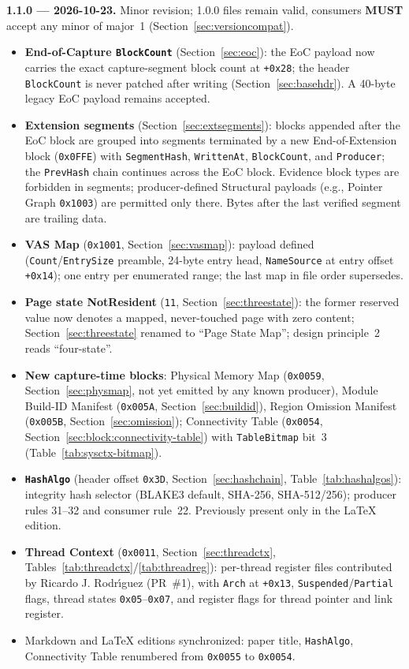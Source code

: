 \documentclass[11pt,a4paper]{article}
\newcommand{\MUST}{\textbf{MUST}}
\newcommand{\hex}[1]{\texttt{0x#1}}
\newcommand{\field}[1]{\texttt{#1}}
\begin{document}
\noindent\textbf{1.1.0 --- 2026-10-23.} Minor revision; 1.0.0 files remain valid, consumers \MUST{} accept any minor of major~1 (Section~\ref{sec:versioncompat}).
\begin{itemize}[leftmargin=1.5em, itemsep=3pt]
\item \textbf{End-of-Capture \field{BlockCount}} (Section~\ref{sec:eoc}): the EoC payload now carries the exact capture-segment block count at \texttt{+0x28}; the header \field{BlockCount} is never patched after writing (Section~\ref{sec:basehdr}). A 40-byte legacy EoC payload remains accepted.
\item \textbf{Extension segments} (Section~\ref{sec:extsegments}): blocks appended after the EoC block are grouped into segments terminated by a new End-of-Extension block (\hex{0FFE}) with \field{SegmentHash}, \field{WrittenAt}, \field{BlockCount}, and \field{Producer}; the \field{PrevHash} chain continues across the EoC block. Evidence block types are forbidden in segments; producer-defined Structural payloads (e.g., Pointer Graph \hex{1003}) are permitted only there. Bytes after the last verified segment are trailing data.
\item \textbf{VAS Map} (\hex{1001}, Section~\ref{sec:vasmap}): payload defined (\field{Count}/\field{EntrySize} preamble, 24-byte entry head, \field{NameSource} at entry offset \texttt{+0x14}); one entry per enumerated range; the last map in file order supersedes.
\item \textbf{Page state NotResident} (\texttt{11}, Section~\ref{sec:threestate}): the former reserved value now denotes a mapped, never-touched page with zero content; Section~\ref{sec:threestate} renamed to ``Page State Map''; design principle~2 reads ``four-state''.
\item \textbf{New capture-time blocks}: Physical Memory Map (\hex{0059}, Section~\ref{sec:physmap}, not yet emitted by any known producer), Module Build-ID Manifest (\hex{005A}, Section~\ref{sec:buildid}), Region Omission Manifest (\hex{005B}, Section~\ref{sec:omission}); Connectivity Table (\hex{0054}, Section~\ref{sec:block:connectivity-table}) with \field{TableBitmap} bit~3 (Table~\ref{tab:sysctx-bitmap}).
\item \textbf{\field{HashAlgo}} (header offset \hex{3D}, Section~\ref{sec:hashchain}, Table~\ref{tab:hashalgos}): integrity hash selector (BLAKE3 default, SHA-256, SHA-512/256); producer rules 31--32 and consumer rule~22. Previously present only in the LaTeX edition.
\item \textbf{Thread Context} (\hex{0011}, Section~\ref{sec:threadctx}, Tables~\ref{tab:threadctx}/\ref{tab:threadreg}): per-thread register files contributed by Ricardo J. Rodr\'{\i}guez (PR~\#1), with \field{Arch} at \texttt{+0x13}, \field{Suspended}/\field{Partial} flags, thread states \hex{05}--\hex{07}, and register flags for thread pointer and link register.
\item Markdown and LaTeX editions synchronized: paper title, \field{HashAlgo}, Connectivity Table renumbered from \hex{0055} to \hex{0054}.
\end{itemize}
\end{document}
